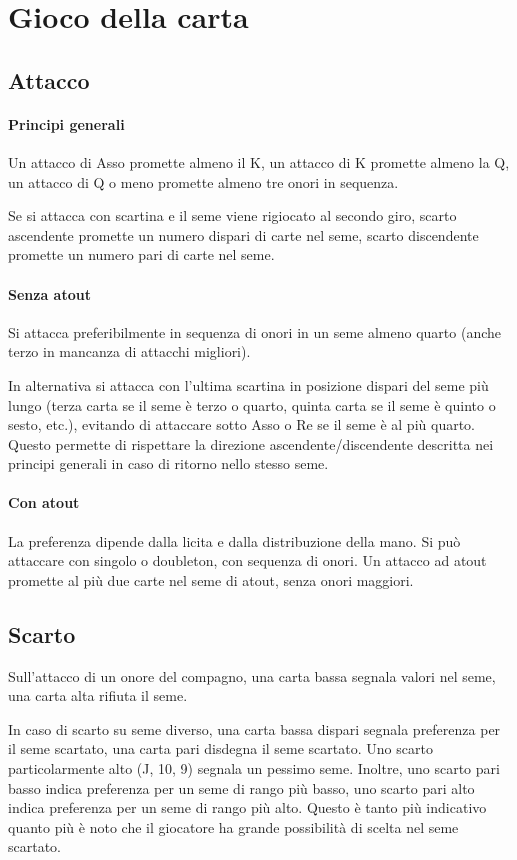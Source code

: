 \documentclass[a4paper,10pt]{article}
\begin{document}
\section{Gioco della carta}

\subsection{Attacco}

\paragraph{Principi generali} Un attacco di Asso promette almeno il K, un attacco di K promette almeno la Q, un attacco di Q o meno promette almeno tre onori in sequenza.

Se si attacca con scartina e il seme viene rigiocato al secondo giro, scarto ascendente promette un numero dispari di carte nel seme, scarto discendente promette un numero pari di carte nel seme.


\paragraph{Senza atout} Si attacca preferibilmente in sequenza di onori in un seme almeno quarto (anche terzo in mancanza di attacchi migliori).

In alternativa si attacca con l'ultima scartina in posizione dispari del seme più lungo (terza carta se il seme è terzo o quarto, quinta carta se il seme è quinto o sesto, etc.), evitando di attaccare sotto Asso o Re se il seme è al più quarto. Questo permette di rispettare la direzione ascendente/discendente descritta nei principi generali in caso di ritorno nello stesso seme.

\paragraph{Con atout} La preferenza dipende dalla licita e dalla distribuzione della mano. Si può attaccare con singolo o doubleton, con sequenza di onori. Un attacco ad atout promette al più due carte nel seme di atout, senza onori maggiori.

\subsection{Scarto}

Sull'attacco di un onore del compagno, una carta bassa segnala valori nel seme, una carta alta rifiuta il seme.

In caso di scarto su seme diverso, una carta bassa dispari segnala preferenza per il seme scartato, una carta pari disdegna il seme scartato. Uno scarto particolarmente alto (J, 10, 9) segnala un pessimo seme. Inoltre, uno scarto pari basso indica preferenza per un seme di rango più basso, uno scarto pari alto indica preferenza per un seme di rango più alto. Questo è tanto più indicativo quanto più è noto che il giocatore ha grande possibilità di scelta nel seme scartato.
\end{document}
